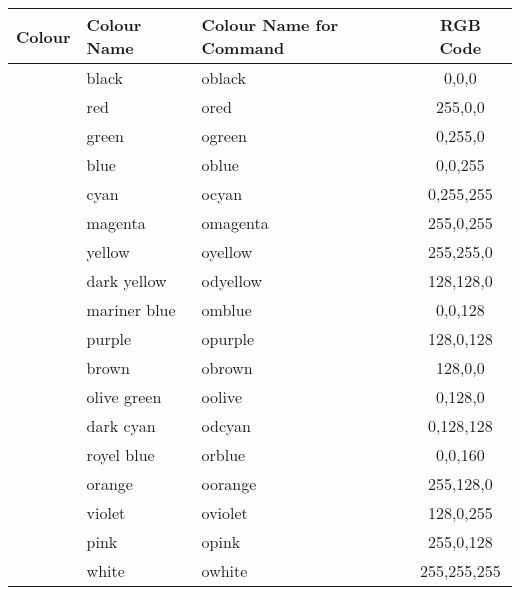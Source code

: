 \documentclass[a4paper,parskip=half,bibtotoc,11pt]{scrartcl}
\begin{document}
\begin{table}[H]
\centering
\begin{tabular}{|l|l|l|c|}
\hline
Colour                   & Colour Name   & Colour Name for Command & RGB Code \\ \hline \hline
\cellcolor[RGB]{0,0,0} & black         & oblack                  & 0,0,0    \\ \hline
\cellcolor[RGB]{255,0,0} & red           & ored                    & 255,0,0    \\ \hline
\cellcolor[RGB]{0,255,0} & green         & ogreen                  & 0,255,0    \\ \hline
\cellcolor[RGB]{0,0,255} & blue          & oblue                   & 0,0,255    \\ \hline
\cellcolor[RGB]{0,255,255} & cyan          & ocyan                   & 0,255,255    \\ \hline
\cellcolor[RGB]{255,0,255} & magenta       & omagenta                & 255,0,255    \\ \hline
\cellcolor[RGB]{255,255,0} & yellow        & oyellow                 & 255,255,0    \\ \hline
\cellcolor[RGB]{128,128,0} & dark yellow   & odyellow                & 128,128,0    \\ \hline
\cellcolor[RGB]{0,0,128} & mariner blue  & omblue                  & 0,0,128    \\ \hline
\cellcolor[RGB]{128,0,128} & purple        & opurple                 & 128,0,128    \\ \hline
\cellcolor[RGB]{128,0,0} & brown         & obrown                  & 128,0,0    \\ \hline
\cellcolor[RGB]{0,128,0} & olive green   & oolive                  & 0,128,0    \\ \hline
\cellcolor[RGB]{0,128,128} & dark cyan     & odcyan                  & 0,128,128    \\ \hline
\cellcolor[RGB]{0,0,160} & royel blue    & orblue                  & 0,0,160    \\ \hline
\cellcolor[RGB]{255,128,0} & orange        & oorange                 & 255,128,0   \\ \hline
\cellcolor[RGB]{128,0,255} & violet        & oviolet                 & 128,0,255    \\ \hline
\cellcolor[RGB]{255,0,128} & pink          & opink                   & 255,0,128    \\ \hline
\cellcolor[RGB]{255,255,255} & white         & owhite                  & 255,255,255    \\ \hline

\end{tabular}
\end{table}
\end{document}
